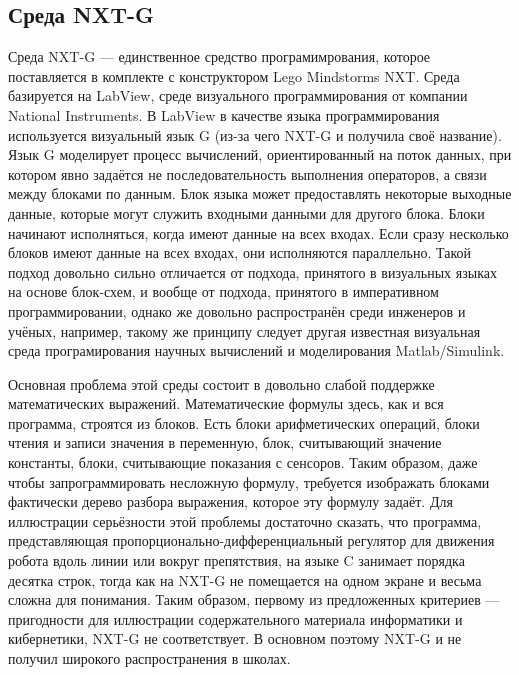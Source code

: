 \documentclass[a4paper]{article}
\begin{document}
\subsection{Среда NXT-G}
Среда NXT-G --- единственное средство програмимрования, которое поставляется в комплекте с конструктором Lego Mindstorms NXT. Среда базируется на LabView, среде визуального программирования от компании National Instruments. В LabView в качестве языка программирования используется визуальный язык G (из-за чего NXT-G и получила своё название). Язык G моделирует процесс вычислений, ориентированный на поток данных, при котором явно задаётся не последовательность выполнения операторов, а связи между блоками по данным. Блок языка может предоставлять некоторые выходные данные, которые могут служить входными данными для другого блока. Блоки начинают исполняться, когда имеют данные на всех входах. Если сразу несколько блоков имеют данные на всех входах, они исполняются параллельно. Такой подход довольно сильно отличается от подхода, принятого в визуальных языках на основе блок-схем, и вообще от подхода, принятого в императивном программировании, однако же довольно распространён среди инженеров и учёных, например, такому же принципу следует другая известная визуальная среда програмирования научных вычислений и моделирования Matlab/Simulink.

Основная проблема этой среды состоит в довольно слабой поддержке математических выражений. Математические формулы здесь, как и вся программа, строятся из блоков. Есть блоки арифметических операций, блоки чтения и записи значения в переменную, блок, считывающий значение константы, блоки, считывающие показания с сенсоров. Таким образом, даже чтобы запрограммировать несложную формулу, требуется изображать блоками фактически дерево разбора выражения, которое эту формулу задаёт. Для иллюстрации серьёзности этой проблемы достаточно сказать, что программа, представляющая пропорционально-дифференциальный регулятор для движения робота вдоль линии или вокруг препятствия, на языке C занимает порядка десятка строк, тогда как на NXT-G не помещается на одном экране и весьма сложна для понимания. Таким образом, первому из предложенных критериев --- пригодности для иллюстрации содержательного материала информатики и кибернетики, NXT-G не соответствует. В основном поэтому NXT-G и не получил широкого распространения в школах.
\end{document}
